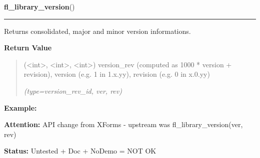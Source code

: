 \hspace{.8\funcindent}\begin{boxedminipage}{\funcwidth}

    \raggedright \textbf{fl\_library\_version}()

    \vspace{-1.5ex}

    \rule{\textwidth}{0.5\fboxrule}
\setlength{\parskip}{2ex}
    Returns consolidated, major and minor version informations.

\setlength{\parskip}{1ex}
      \textbf{Return Value}
    \vspace{-1ex}

      \begin{quote}
      ({\textless}int{\textgreater}, {\textless}int{\textgreater}, 
      {\textless}int{\textgreater}) version\_rev (computed as 1000 * 
      version + revision), version (e.g. 1 in 1.x.yy), revision (e.g. 0 in 
      x.0.yy)

      {\it (type=version\_rev\_id, ver, rev)}

      \end{quote}

\textbf{Example:} 

\textbf{Attention:} API change from XForms - upstream was fl\_library\_version(ver, rev)



\textbf{Status:} Untested + Doc + NoDemo = NOT OK



    \end{boxedminipage}

    \label{xformslib:library:fl_bgn_form}

    \vspace{0.5ex}


